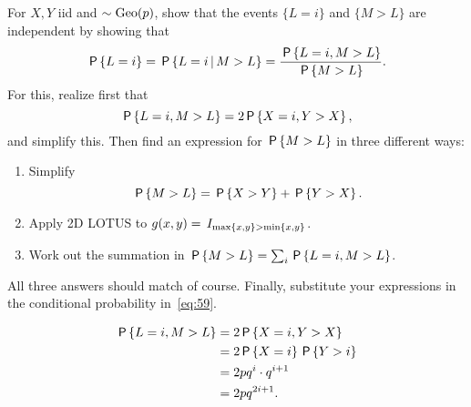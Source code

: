 \documentclass[a4paper,11pt]{article}
\begin{document}
\begin{exercise}\label{ex:10}
For  $X, Y$ iid and $\sim \Geo{p}$, show that the events $\{L=i\}$ and $\{M>L\}$ are independent by showing that 
\begin{equation}
  \label{eq:59}
\P{L=i} = \P{L=i \given M>L} =  \frac{\P{L=i, M > L}}{\P{M>L}}.
\end{equation}
For this, realize first that 
\begin{equation}
  \label{eq:62}
\P{L=i,  M > L} = 2\P{X=i,Y > X},
\end{equation}
and simplify this. Then find an expression for $\P{M>L}$ in three different ways:
\begin{enumerate}
\item Simplify 
  \begin{equation}
    \label{eq:61}
\P{M>L}  = \P{X>Y} + \P{Y > X}.
  \end{equation}
\item Apply  2D LOTUS to $g(x,y) = \1{\max{x,y}>\min{x,y}}$.
\item Work out the summation in $\P{M>L} = \sum_{i} \P{L=i, M>L}$.
\end{enumerate}
All three answers should match of course. Finally, substitute your expressions in the conditional probability in~\cref{eq:59}. 
\begin{solution}
\begin{align}
\P{L=i,  M > L} 
&= 2\P{X=i,Y > X} \\
&= 2\P{X=i}\P{Y > i} \\
&= 2pq^i\cdot q^{i+1}\\
&= 2p q^{2i+1}.
\end{align}


\end{solution}
\end{exercise}
\end{document}
